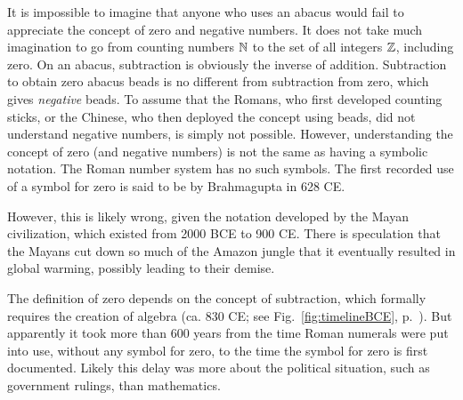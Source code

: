 \documentclass{ximera}
\begin{document}
It is impossible to imagine that anyone who uses an abacus would fail to appreciate the concept of zero and
negative numbers. It does not take much imagination to go from counting numbers $\mathbb{N}$ to the set of
all integers $\mathbb{Z}$, including zero.  On an abacus, subtraction is obviously the inverse of addition. 
Subtraction to obtain zero abacus beads is no different from subtraction from zero, which gives
\emph{negative} beads.  To assume that the Romans, who first developed counting sticks, or the Chinese,
who then deployed the concept using beads, did not understand negative numbers, is simply not possible.
However, understanding the concept of zero (and negative numbers) is not the same as having a symbolic
notation.  The Roman number system has no such symbols. 
The first recorded use of a symbol for zero is said to be by Brahmagupta in 628 CE.%

However, this is likely wrong, given the notation developed by the Mayan civilization,
which existed from
2000 BCE to 900 CE.%
There is speculation that the Mayans cut down so much of the Amazon jungle that it eventually resulted
in global warming, possibly leading to their demise.

The definition of zero depends on the concept of subtraction, which formally requires the
creation of algebra (ca. 830 CE; see Fig.~\ref{fig:timelineBCE}, p.~\pageref{fig:timelineBCE}).
But apparently it took more than 600 years from the time Roman numerals were put into use, without
any symbol for zero, to the time the symbol for zero is first documented.
Likely this delay was more about the political situation, such as government rulings, than mathematics.

\end{document}
